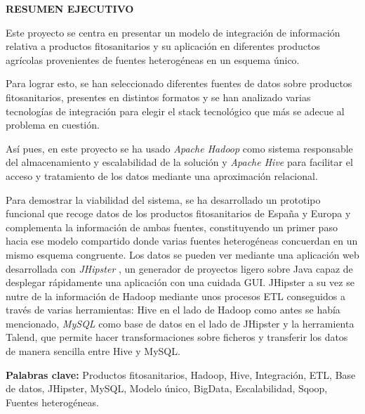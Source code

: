 \begin{center}

{\Large \bfseries RESUMEN EJECUTIVO}

\vspace{1.5cm}
\end{center}


Este proyecto se centra en presentar un modelo de integración de información relativa a productos fitosanitarios y su aplicación en diferentes productos agrícolas provenientes de fuentes heterogéneas en un esquema único. \par
Para lograr esto, se han seleccionado diferentes fuentes de datos sobre productos fitosanitarios, presentes en distintos formatos y se han analizado varias tecnologías de integración para elegir el stack tecnológico que más se adecue al problema en cuestión.\par
Así pues, en este proyecto se ha usado \textit{Apache Hadoop} \cite{hadoop} como sistema responsable del almacenamiento y escalabilidad de la solución y \textit{Apache Hive} \cite{hive} para facilitar el acceso y tratamiento de los datos mediante una aproximación relacional.\par
Para demostrar la viabilidad del sistema, se ha desarrollado un prototipo funcional que recoge datos de los productos fitosanitarios de España y Europa y complementa la información de ambas fuentes, constituyendo un primer paso hacia ese modelo compartido donde varias fuentes heterogéneas concuerdan en un mismo esquema congruente. Los datos se pueden ver mediante una aplicación web desarrollada con \textit{JHipster} \cite{jhipster}, un generador de proyectos ligero sobre Java capaz de desplegar rápidamente una aplicación con una cuidada GUI. JHipster a su vez se nutre de la información de Hadoop mediante unos procesos ETL conseguidos a través de varias herramientas: Hive en el lado de Hadoop como antes se había mencionado, \textit{MySQL} \cite{mysql} como base de datos en el lado de JHipster y la herramienta Talend, que permite hacer transformaciones sobre ficheros y transferir los datos de manera sencilla entre Hive y MySQL. \\\par

\textbf{Palabras clave:}  Productos fitosanitarios, Hadoop, Hive, Integración, ETL, Base de datos, JHipster, MySQL, Modelo único, BigData, Escalabilidad, Sqoop, Fuentes heterogéneas.
